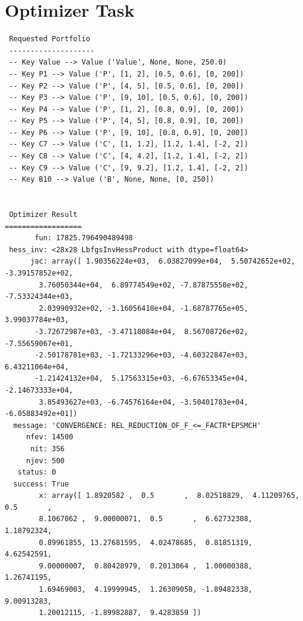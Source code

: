 \documentclass[12pt]{article}
\begin{document}
\section{Optimizer Task} 
 \begin{verbatim} 
 Requested Portfolio 
 -------------------- 
 -- Key Value --> Value ('Value', None, None, 250.0) 
 -- Key P1 --> Value ('P', [1, 2], [0.5, 0.6], [0, 200]) 
 -- Key P2 --> Value ('P', [4, 5], [0.5, 0.6], [0, 200]) 
 -- Key P3 --> Value ('P', [9, 10], [0.5, 0.6], [0, 200]) 
 -- Key P4 --> Value ('P', [1, 2], [0.8, 0.9], [0, 200]) 
 -- Key P5 --> Value ('P', [4, 5], [0.8, 0.9], [0, 200]) 
 -- Key P6 --> Value ('P', [9, 10], [0.8, 0.9], [0, 200]) 
 -- Key C7 --> Value ('C', [1, 1.2], [1.2, 1.4], [-2, 2]) 
 -- Key C8 --> Value ('C', [4, 4.2], [1.2, 1.4], [-2, 2]) 
 -- Key C9 --> Value ('C', [9, 9.2], [1.2, 1.4], [-2, 2]) 
 -- Key B10 --> Value ('B', None, None, [0, 250]) 
 
 
 Optimizer Result
================== 
       fun: 17825.796490489498
 hess_inv: <28x28 LbfgsInvHessProduct with dtype=float64>
      jac: array([ 1.90356224e+03,  6.03827099e+04,  5.50742652e+02, -3.39157852e+02,
        3.76050344e+04,  6.89774549e+02, -7.87875550e+02, -7.53324344e+03,
        2.03990932e+02, -3.16056418e+04, -1.68787765e+05,  3.99037784e+03,
       -3.72672987e+03, -3.47118084e+04,  8.56708726e+02, -7.55659067e+01,
       -2.50178781e+03, -1.72133296e+03, -4.60322847e+03,  6.43211064e+04,
       -1.21424132e+04,  5.17563315e+03, -6.67653345e+04, -2.14673333e+04,
        3.85493627e+03, -6.74576164e+04, -3.50401783e+04, -6.05883492e+01])
  message: 'CONVERGENCE: REL_REDUCTION_OF_F_<=_FACTR*EPSMCH'
     nfev: 14500
      nit: 356
     njev: 500
   status: 0
  success: True
        x: array([ 1.8920582 ,  0.5       ,  8.02518829,  4.11209765,  0.5       ,
        8.1067062 ,  9.00000071,  0.5       ,  6.62732308,  1.18792324,
        0.89961855, 13.27681595,  4.02478685,  0.81851319,  4.62542591,
        9.00000007,  0.80428979,  0.2013064 ,  1.00000388,  1.26741195,
        1.69469003,  4.19999945,  1.26309058, -1.89482338,  9.00913283,
        1.20012115, -1.89982887,  9.4283859 ])
 \end{verbatim}
\end{document}
